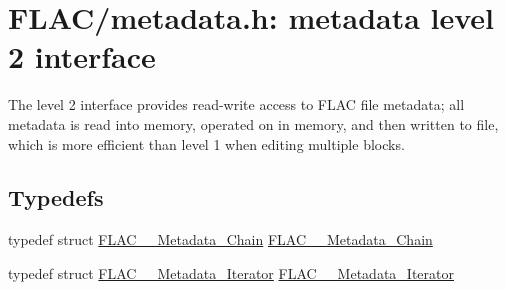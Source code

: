 \hypertarget{group__flac__metadata__level2}{}\section{F\+L\+A\+C/metadata.h\+: metadata level 2 interface}
\label{group__flac__metadata__level2}


The level 2 interface provides read-\/write access to F\+L\+AC file metadata; all metadata is read into memory, operated on in memory, and then written to file, which is more efficient than level 1 when editing multiple blocks.  


\subsection*{Typedefs}
\begin{DoxyCompactItemize}
\item 
typedef struct \mbox{\hyperlink{group__flac__metadata__level2_gaec6993c60b88f222a52af86f8f47bfdf}{F\+L\+A\+C\+\_\+\+\_\+\+Metadata\+\_\+\+Chain}} \mbox{\hyperlink{group__flac__metadata__level2_gaec6993c60b88f222a52af86f8f47bfdf}{F\+L\+A\+C\+\_\+\+\_\+\+Metadata\+\_\+\+Chain}}
\item 
typedef struct \mbox{\hyperlink{group__flac__metadata__level2_ga9f3e135a07cdef7e51597646aa7b89b2}{F\+L\+A\+C\+\_\+\+\_\+\+Metadata\+\_\+\+Iterator}} \mbox{\hyperlink{group__flac__metadata__level2_ga9f3e135a07cdef7e51597646aa7b89b2}{F\+L\+A\+C\+\_\+\+\_\+\+Metadata\+\_\+\+Iterator}}
\end{DoxyCompactItemize}
